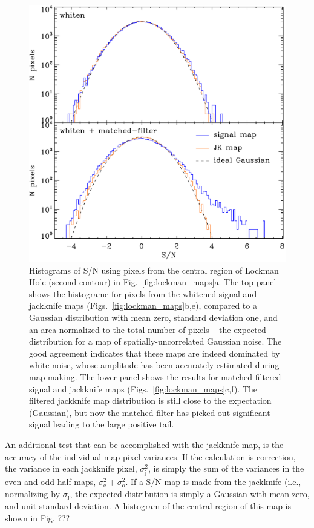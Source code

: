 \documentclass[useAMS,usenatbib,nofootinbib]{mn2e}
\begin{document}
\begin{figure}
\centering
\includegraphics[width=\linewidth]{lockman_hist.pdf}
\caption{Histograms of S/N using pixels from the central region of
  Lockman Hole (second contour) in Fig.~\ref{fig:lockman_maps}a. The
  top panel shows the histograme for pixels from the whitened signal
  and jackknife maps (Figs.~\ref{fig:lockman_maps}b,e), compared to a
  Gaussian distribution with mean zero, standard deviation one, and an
  area normalized to the total number of pixels -- the expected
  distribution for a map of spatially-uncorrelated Gaussian noise. The
  good agreement indicates that these maps are indeed dominated by
  white noise, whose amplitude has been accurately estimated during
  map-making. The lower panel shows the results for matched-filtered
  signal and jackknife maps (Figs.~\ref{fig:lockman_maps}c,f). The
  filtered jackknife map distribution is still close to the
  expectation (Gaussian), but now the matched-filter has picked out
  significant signal leading to the large positive tail. }
\label{fig:lockman_hist}
\end{figure}

An additional test that can be accomplished with the jackknife map, is
the accuracy of the individual map-pixel variances. If the calculation
is correction, the variance in each jackknife pixel,
$\sigma^2_\mathrm{j}$, is simply the sum of the variances in the even
and odd half-maps, $\sigma^2_\mathrm{e} + \sigma^2_\mathrm{o}$. If a
S/N map is made from the jackknife (i.e., normalizing by
$\sigma_\mathrm{j}$, the expected distribution is simply a Gaussian
with mean zero, and unit standard deviation. A histogram of the
central region of this map is shown in Fig. ???
\end{document}
